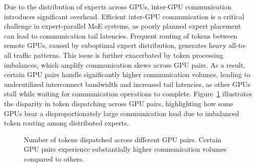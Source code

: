 \noindent{}
\vspace{0.5em}


%
Due to the distribution of experts across GPUs, inter-GPU communication introduces significant overhead.
% 
Efficient inter-GPU communication is a critical challenge in expert-parallel MoE systems, as poorly planned expert placement can lead to communication tail latencies.
% 
Frequent routing of tokens between remote GPUs, caused by suboptimal expert distribution, generates heavy all-to-all traffic patterns.
% 
This issue is further exacerbated by token processing imbalances, which amplify communication skews across GPU pairs.
% 
As a result, certain GPU pairs handle significantly higher communication volumes, leading to underutilized interconnect bandwidth and increased tail latencies, as other GPUs stall while waiting for communication operations to complete.
% 
Figure~\ref{fig:token-dispatching} illustrates the disparity in token dispatching across GPU pairs, highlighting how some GPUs bear a disproportionately large communication load due to imbalanced token routing among distributed experts.

\begin{figure}[h!]
    \centering
    
    \vspace{-1.5em}
    \caption{Number of tokens dispatched across different GPU pairs. Certain GPU pairs experience substantially higher communication volumes compared to others.}
    \label{fig:token-dispatching}
\end{figure}


\noindent{}

